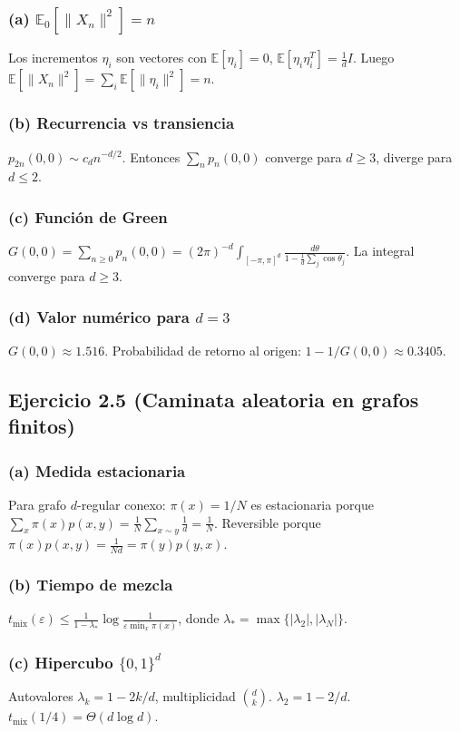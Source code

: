 \documentclass[letterpaper, 12pt]{article}
\newcommand{\E}{\mathbb{E}}
\newcommand{\1}{\mathbbm{1}}
\begin{document}
    \subsubsection*{(a) $\E_0[\|X_n\|^2]=n$}
    Los incrementos $\eta_i$ son vectores con $\E[\eta_i]=0$, $\E[\eta_i\eta_i^T]=\frac1d I$. Luego $\E[\|X_n\|^2]=\sum_i\E[\|\eta_i\|^2]=n$.

    \subsubsection*{(b) Recurrencia vs transiencia}
    $p_{2n}(0,0)\sim c_d n^{-d/2}$. Entonces $\sum_n p_n(0,0)$ converge para $d\ge3$, diverge para $d\le2$.

    \subsubsection*{(c) Funci\'on de Green}
    $G(0,0)=\sum_{n\ge0}p_n(0,0)=(2\pi)^{-d}\int_{[-\pi,\pi]^d}\frac{d\theta}{1-\frac1d\sum_j\cos\theta_j}$. La integral converge para $d\ge3$.

    \subsubsection*{(d) Valor num\'erico para $d=3$}
    $G(0,0)\approx1.516$. Probabilidad de retorno al origen: $1-1/G(0,0)\approx0.3405$.

    \subsection{Ejercicio 2.5 (Caminata aleatoria en grafos finitos)}

    \subsubsection*{(a) Medida estacionaria}
    Para grafo $d$-regular conexo: $\pi(x)=1/N$ es estacionaria porque $\sum_x \pi(x)p(x,y)=\frac1N\sum_{x\sim y}\frac1d=\frac1N$. Reversible porque $\pi(x)p(x,y)=\frac1{Nd}=\pi(y)p(y,x)$.

    \subsubsection*{(b) Tiempo de mezcla}
    $t_{\text{mix}}(\varepsilon)\le\frac{1}{1-\lambda_*}\log\frac{1}{\varepsilon\min_x\pi(x)}$, donde $\lambda_*=\max\{|\lambda_2|,|\lambda_N|\}$.

    \subsubsection*{(c) Hipercubo $\{0,1\}^d$}
    Autovalores $\lambda_k=1-2k/d$, multiplicidad $\binom{d}{k}$. $\lambda_2=1-2/d$. $t_{\text{mix}}(1/4)=\Theta(d\log d)$.
\end{document}
